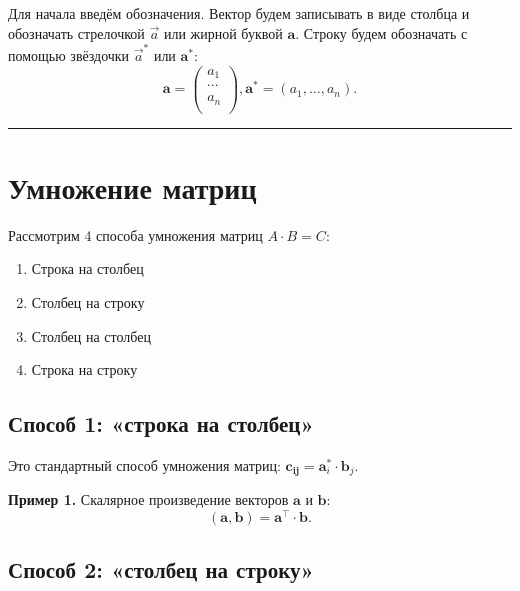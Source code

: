 \documentclass[11pt,a4paper]{article}
\renewcommand{\linethickness}{0.1ex}
\providecommand{\tightlist}{%
      \setlength{\itemsep}{0pt}\setlength{\parskip}{0pt}}
\begin{document}
Для начала введём обозначения. Вектор будем записывать в виде столбца и
обозначать стрелочкой \(\vec{a}\) или жирной буквой \(\mathbf{a}\).
Строку будем обозначать с помощью звёздочки \(\vec{a}^*\) или
\(\mathbf{a}^*\): \[
  \mathbf{a} =
  \begin{pmatrix}
     a_1    \\
     \cdots \\
     a_n    \\
  \end{pmatrix},
  \mathbf{a}^* = (a_1, \ldots, a_n).
\]

    \begin{center}\rule{0.5\linewidth}{\linethickness}\end{center}

    \hypertarget{ux443ux43cux43dux43eux436ux435ux43dux438ux435-ux43cux430ux442ux440ux438ux446}{%
\section{Умножение
матриц}\label{ux443ux43cux43dux43eux436ux435ux43dux438ux435-ux43cux430ux442ux440ux438ux446}}

Рассмотрим 4 способа умножения матриц \(A \cdot B = C\):

\begin{enumerate}
\def\labelenumi{\arabic{enumi}.}
\tightlist
\item
  Строка на столбец
\item
  Столбец на строку
\item
  Столбец на столбец
\item
  Строка на строку
\end{enumerate}

    \hypertarget{ux441ux43fux43eux441ux43eux431-1-ux441ux442ux440ux43eux43aux430-ux43dux430-ux441ux442ux43eux43bux431ux435ux446}{%
\subsection{Способ 1: «строка на
столбец»}\label{ux441ux43fux43eux441ux43eux431-1-ux441ux442ux440ux43eux43aux430-ux43dux430-ux441ux442ux43eux43bux431ux435ux446}}

Это стандартный способ умножения матриц:
\(\mathbf{c_{ij}} = \mathbf{a}_i^* \cdot \mathbf{b}_j\).

\textbf{Пример 1.} Скалярное произведение векторов \(\mathbf{a}\) и
\(\mathbf{b}\):
\[ (\mathbf{a}, \mathbf{b}) = \mathbf{a}^\top \cdot \mathbf{b}. \]

    \hypertarget{ux441ux43fux43eux441ux43eux431-2-ux441ux442ux43eux43bux431ux435ux446-ux43dux430-ux441ux442ux440ux43eux43aux443}{%
\subsection{Способ 2: «столбец на
строку»}\label{ux441ux43fux43eux441ux43eux431-2-ux441ux442ux43eux43bux431ux435ux446-ux43dux430-ux441ux442ux440ux43eux43aux443}}
\end{document}
